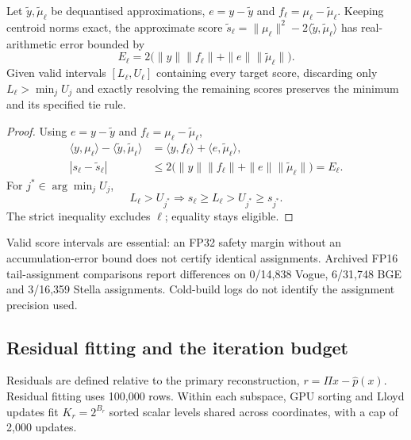 \begin{resultblock}
\begin{lemma}
\label{lem:4-assignment-bound}
Let $\widetilde y,\widetilde\mu_\ell$ be dequantised approximations,
$e=y-\widetilde y$ and $f_\ell=\mu_\ell-\widetilde\mu_\ell$.
Keeping centroid norms exact, the approximate score
$\widetilde s_\ell=\|\mu_\ell\|^2-2\langle\widetilde y,\widetilde\mu_\ell\rangle$
has real-arithmetic error bounded by
\begin{equation}
 E_\ell=2\bigl(\|y\|\|f_\ell\|+\|e\|\|\widetilde\mu_\ell\|\bigr).
 \label{eq:4-assignment-bound}
\end{equation}
Given valid intervals $[L_\ell,U_\ell]$ containing every target score,
discarding only $L_\ell>\min_j U_j$ and exactly resolving the remaining
scores preserves the minimum and its specified tie rule.
\end{lemma}
\begin{proof}
Using $e=y-\widetilde y$ and $f_\ell=\mu_\ell-\widetilde\mu_\ell$,
\[
 \begin{aligned}
 \langle y,\mu_\ell\rangle-
 \langle\widetilde y,\widetilde\mu_\ell\rangle
 &=\langle y,f_\ell\rangle
   +\langle e,\widetilde\mu_\ell\rangle,\\
 |s_\ell-\widetilde s_\ell|
 &\leq2\bigl(\|y\|\|f_\ell\|
       +\|e\|\|\widetilde\mu_\ell\|\bigr)=E_\ell .
 \end{aligned}
\]
For $j^*\in\arg\min_j U_j$,
\[
 L_\ell>U_{j^*}
 \Longrightarrow
 s_\ell\geq L_\ell>U_{j^*}\geq s_{j^*}.
\]
The strict inequality excludes $\ell$; equality stays eligible.
\end{proof}
\end{resultblock}

Valid score intervals are essential: an FP32 safety margin without an
accumulation-error bound does not certify identical assignments. Archived
FP16 tail-assignment comparisons report differences on 0/14,838 Vogue,
6/31,748 BGE and 3/16,359 Stella assignments. Cold-build logs do not
identify the assignment precision used.

\subsection{Residual fitting and the iteration budget}

Residuals are defined relative to the primary reconstruction,
$r=\Pi x-\widehat p(x)$. Residual fitting uses 100,000 rows. Within each
subspace, GPU sorting and Lloyd updates fit $K_r=2^{B_r}$ sorted scalar
levels shared across coordinates, with a cap of 2,000 updates.

